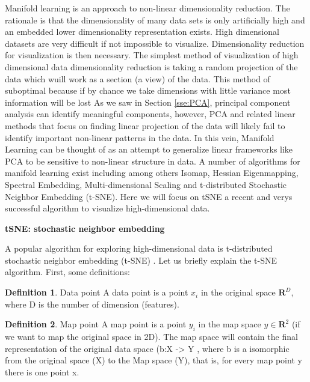 \documentclass[11pt]{article}
\theoremstyle{definition}
\newtheorem{definition}{Definition}[section]
\theoremstyle{remark}
\begin{document}
{Manifold learning is an approach to non-linear dimensionality reduction. The rationale is that the dimensionality of many data sets is only artificially high and an embedded lower dimensionality representation exists. High dimensional datasets are very difficult if not impossible to visualize. Dimensionality reduction for visualization is then necessary. The simplest method of visualization of high dimensional data  dimensionality reduction is taking a random projection of the data which wuill work as a section (a view) of the data. This method of suboptimal because if by chance we take dimensions with little variance most information will be lost
As we saw in Section \ref{sse:PCA}, principal component analysis can identify meaningful components, however, PCA and related linear methods that focus on finding linear projection of the data will likely fail to identify important non-linear patterns in the data. 
In this vein, Manifold Learning can be thought of as an attempt to generalize linear frameworks like PCA to be sensitive to non-linear structure in data. 
A number of algorithms for  manifold learning  exist including among others Isomap, Hessian Eigenmapping, Spectral Embedding, Multi-dimensional Scaling and t-distributed Stochastic Neighbor Embedding (t-SNE). Here we will focus on tSNE a recent and verys successful algorithm to visualize high-dimensional data.

\textbf{tSNE: stochastic neighbor embedding}

A popular algorithm for exploring high-dimensional data is t-distributed stochastic neighbor embedding (t-SNE) \cite{maaten2008visualizing}.
Let us briefly explain the t-SNE algorithm. First, some definitions:


\theoremstyle{definition}
\begin{definition}{Data point}
A data point is a point $x_i$ in the original space $\mathbf{R}^D$, where D is the number of dimension (features).
\end{definition}
\begin{definition}{Map point}
A map point is a point $y_i$ in the map space $y \in \mathbf{R}^2$ (if we want to map the original space in 2D). The map space will contain the final representation of the original data space (b:X -> Y , where b is a isomorphic from the original space (X) to the Map space (Y), that is, for every map point y there is one point x. 
\end{definition}
 
}
\end{document}

